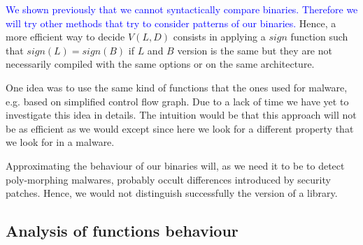 \documentclass{article}
\newcommand{\ludo}[1]{\textcolor{blue}{#1}}
\newcommand{\signature}{{sign}}
\begin{document}
    \ludo{We shown previously that we cannot syntactically compare binaries.
    Therefore we will try other methods that try to consider patterns of our
    binaries.} Hence, a more efficient way to decide $V(L,D)$ consists in
    applying a $\signature$ function such that $\signature(L) = \signature(B)$
    if $L$ and $B$ version is the same but they are not necessarily
    compiled with the same options or on the same architecture.
	
    One idea was to use the same kind of functions that the ones used for malware, e.g.
    based on simplified control flow graph. Due to a lack of time we have yet 
    to investigate this idea in details. The intuition would be that this
    approach will not be as efficient as we would except since here we look
    for a different property that we look for in a malware. 
    
    Approximating the behaviour of our binaries will, as we need it to be to
    detect poly-morphing malwares, probably occult differences introduced by
    security patches. Hence, we would not distinguish successfully the version
    of a library.
	
	\subsection{Analysis of functions behaviour}
	

 

    
    
    
   
\end{document}
